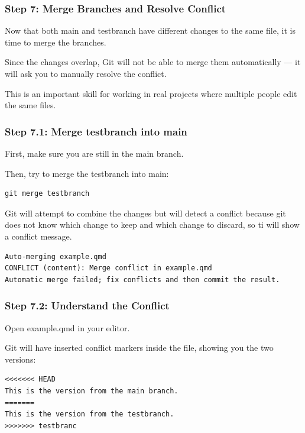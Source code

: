 \documentclass[
  11pt,
  a4paper,
]{article}
\begin{document}
\newpage

\subsubsection{Step 7: Merge Branches and Resolve
Conflict}\label{step-7-merge-branches-and-resolve-conflict}

Now that both main and testbranch have different changes to the same
file, it is time to merge the branches.

Since the changes overlap, Git will not be able to merge them
automatically --- it will ask you to manually resolve the conflict.

This is an important skill for working in real projects where multiple
people edit the same files.

\subsubsection{Step 7.1: Merge testbranch into
main}\label{step-7.1-merge-testbranch-into-main}

First, make sure you are still in the main branch.

Then, try to merge the testbranch into main:

\begin{verbatim}
git merge testbranch
\end{verbatim}

Git will attempt to combine the changes but will detect a conflict
because git does not know which change to keep and which change to
discard, so ti will show a conflict message.

\begin{verbatim}
Auto-merging example.qmd
CONFLICT (content): Merge conflict in example.qmd
Automatic merge failed; fix conflicts and then commit the result.
\end{verbatim}

\subsubsection{Step 7.2: Understand the
Conflict}\label{step-7.2-understand-the-conflict}

Open example.qmd in your editor.

Git will have inserted conflict markers inside the file, showing you the
two versions:

\begin{verbatim}
<<<<<<< HEAD
This is the version from the main branch.
=======
This is the version from the testbranch.
>>>>>>> testbranc
\end{verbatim}
\end{document}
